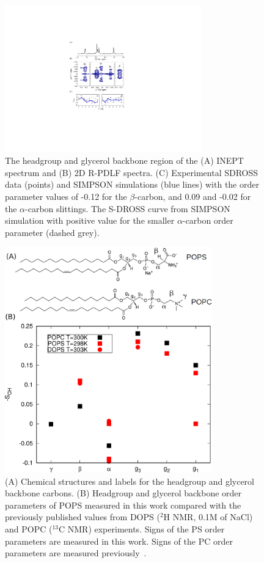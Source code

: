 \documentclass[aps,prl,superscriptaddress,twocolumn]{revtex4}
\begin{document}
\begin{figure}[!tb]
  \centering
  \includegraphics[width=8.5cm]{../Figs/fig1_POPS.pdf}
  \caption{\label{PShgSIGNSsimpson}
    The headgroup and glycerol backbone region of the (A) INEPT spectrum and
    (B) 2D R-PDLF spectra.
    (C) Experimental SDROSS data (points) and SIMPSON simulations (blue lines) with
    the order parameter values of -0.12 for the $\beta$-carbon, and 0.09 and -0.02
    for the $\alpha$-carbon slittings. The S-DROSS curve from SIMPSON simulation with positive value
    for the smaller $\alpha$-carbon order parameter (dashed grey).
  }
\end{figure}
\begin{figure}[!htb]
  \centering
  \includegraphics[width=9.0cm]{../Figs/PCPScomp.eps}
  \caption{\label{HGorderParameters}
    (A) Chemical structures and labels for the headgroup and glycerol backbone carbons.
    (B) Headgroup and glycerol backbone order parameters of POPS measured in this work compared
    with the previously published values from DOPS ($^2$H NMR, 0.1M of NaCl) \cite{browning80} and 
    POPC  ($^{13}$C NMR) \cite{ferreira13} experiments. Signs of the PS order parameters
    are measured in this work. Signs of the PC order parameters are measured previously~\cite{ferreira16}.
  }
\end{figure}
\end{document}
